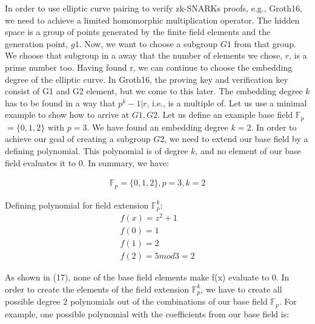 In order to use elliptic curve pairing to verify zk-SNARKs proofs, e.g., Groth16, we need to achieve a limited homomorphic multiplication operator. The hidden space is a group of points generated by the finite field elements and the generation point, \(g1\). Now, we want to choose a subgroup \(G1\) from that group. We choose that subgroup in a away that the number of elements we chose, \(r\), is a prime number too. Having found r, we can continue to choose the embedding degree of the elliptic curve. In Groth16, the proving key and verification key consist of G1 and G2 element, but we come to this later. The embedding degree \(k\) has to be found in a way that \(p^k-1|r\), i.e., is a multiple of. Let us use a minimal example to show how to arrive at \(G1, G2\).
Let us define an example base field \begin{math}\mathbb{F}_p\end{math} \(= \{0,1,2\}\) with \(p = 3\). We have found an embedding degree \(k=2\). In order to achieve our goal of creating a subgroup \(G2\), we need to extend our base field by a defining polynomial. This polynomial is of degree \(k\), and no element of our base field evaluates it to 0. In summary, we have:

\begin{align}
    \mathbb{F}_p = \{0,1,2\}, p = 3, k = 2
\end{align}

Defining polynomial for field extension \begin{math}\mathbb{F}_p^k\end{math}: 
\begin{align}
    f(x) = z^2 +1 \\
    f(0) = 1\\
    f(1) = 2\\
    f(2) = 5 mod 3 = 2
\end{align}

As shown in (17), none of the base field elements make f(x) evaluate to 0. In order to create the elements of the field extension \begin{math}\mathbb{F}_p^k\end{math}, we have to create all possible degree 2 polynomials out of the combinations of our base field \begin{math}\mathbb{F}_p\end{math}. For example, one possible polynomial with the coefficients from our base field is:

